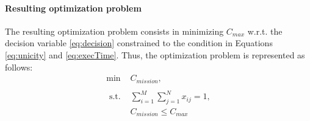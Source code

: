 \documentclass[conference]{IEEEtran}
\begin{document}
\paragraph{Resulting optimization problem}

The resulting optimization problem consists in minimizing $C_{max}$ w.r.t. the decision variable \eqref{eq:decision} constrained to the condition in Equations \eqref{eq:unicity} and \eqref{eq:execTime}. Thus, the optimization problem is represented as follows:
%
\begin{equation}
	\label{eq:optproblem}
	\begin{array}{ccc}
		\min & C_{mission},  \\
  \\
		\textrm{ s.t. } & \sum_{i=1}^{M}{\sum_{j=1}^{N}{x_{ij}}}=1, \\
		& C_{mission}\leq C_{max}
 \\
	\end{array}
\end{equation}	
%
%
%
%
%
%
%
%
\end{document}
